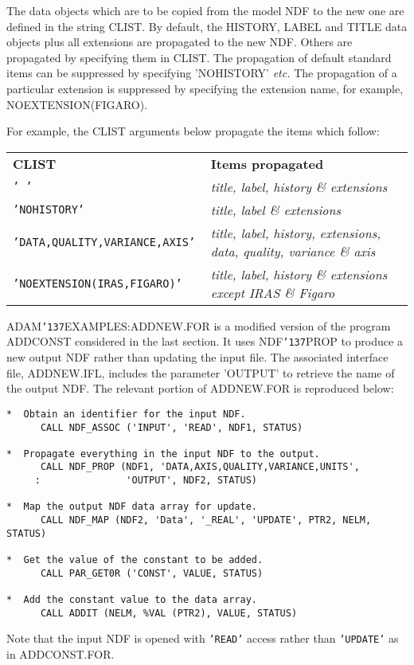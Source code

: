 \documentclass[twoside,11pt]{article}
\renewcommand{\_}{{\tt\char'137}}
\begin{document}
The data objects which are to be copied from the model NDF to the
new one are defined in the string CLIST.
By default, the HISTORY, LABEL and TITLE 
data objects plus all extensions
are propagated to the new NDF.
Others are propagated by specifying them in CLIST.
The propagation of default standard items can be suppressed by 
specifying 'NOHISTORY' {\it etc.}
The propagation of a particular extension is suppressed by specifying the 
extension name, for example, NOEXTENSION(FIGARO).

For example, the CLIST arguments below propagate the items which follow:

\begin{tabular}{ll}
{\bf{CLIST}                             }&\bf{Items propagated}\\
{\tt ' '                                }&{\sl title, label, history \& extensions}\\
{\tt 'NOHISTORY'                        }&{\sl title, label \& extensions}\\
{\tt 'DATA,QUALITY,VARIANCE,AXIS'       }&{\sl title, label, history, extensions, data, quality, variance \& axis}\\
{\tt 'NOEXTENSION(IRAS,FIGARO)'         }&{\sl title, label, history \& extensions except IRAS \& Figaro}\\
\end{tabular}

ADAM\_EXAMPLES:ADDNEW.FOR is 
a modified version of the program ADDCONST considered in the last section.
It uses NDF\_PROP to produce a new output NDF rather than updating the input 
file.
The associated interface file, ADDNEW.IFL, includes the
parameter 'OUTPUT' to retrieve the name of  the output NDF.
The relevant portion of ADDNEW.FOR is reproduced below:
\begin{verbatim}
*  Obtain an identifier for the input NDF.
      CALL NDF_ASSOC ('INPUT', 'READ', NDF1, STATUS)           

*  Propagate everything in the input NDF to the output.
      CALL NDF_PROP (NDF1, 'DATA,AXIS,QUALITY,VARIANCE,UNITS',
     :               'OUTPUT', NDF2, STATUS)
                                                              
*  Map the output NDF data array for update.
      CALL NDF_MAP (NDF2, 'Data', '_REAL', 'UPDATE', PTR2, NELM, STATUS)
                                            
*  Get the value of the constant to be added.
      CALL PAR_GET0R ('CONST', VALUE, STATUS)

*  Add the constant value to the data array.
      CALL ADDIT (NELM, %VAL (PTR2), VALUE, STATUS)             
\end{verbatim}
Note that the input NDF is opened with {\tt 'READ'} access rather than
{\tt 'UPDATE'} as in ADDCONST.FOR.
\end{document}
